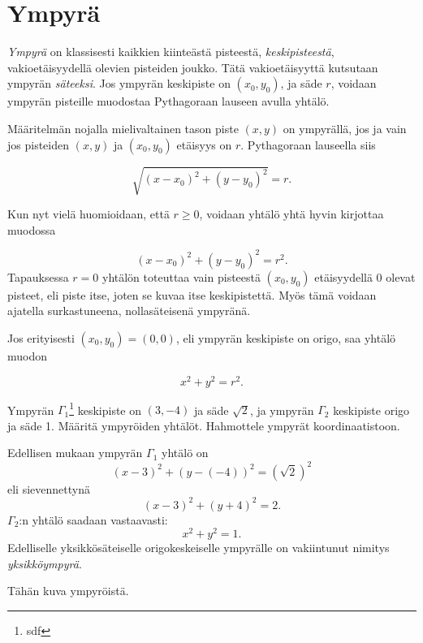 \section{Ympyrä}


\emph{Ympyrä} on klassisesti kaikkien kiinteästä pisteestä, \emph{keskipisteestä}, vakioetäisyydellä olevien pisteiden joukko. Tätä vakioetäisyyttä kutsutaan ympyrän \emph{säteeksi}. Jos ympyrän keskipiste on $(x_{0},y_{0})$, ja säde $r$, voidaan ympyrän pisteille muodostaa Pythagoraan lauseen avulla yhtälö.

Määritelmän nojalla mielivaltainen tason piste $(x,y)$ on ympyrällä, jos ja vain jos pisteiden $(x,y)$ ja $(x_{0},y_{0})$ etäisyys on $r$. Pythagoraan lauseella siis

\[
\sqrt{(x-x_{0})^{2}+(y-y_{0})^{2}} = r.
\]

Kun nyt vielä huomioidaan, että $r \geq 0$, voidaan yhtälö yhtä hyvin kirjottaa muodossa

\[
(x-x_{0})^{2}+(y-y_{0})^{2} = r^{2}.
\]
Tapauksessa $r=0$ yhtälön toteuttaa vain pisteestä $(x_{0},y_{0})$ etäisyydellä 0 olevat pisteet, eli piste itse, joten se kuvaa itse keskipistettä. Myös tämä voidaan ajatella surkastuneena, nollasäteisenä ympyränä.

Jos erityisesti $(x_{0},y_{0})= (0,0)$, eli ympyrän keskipiste on origo, saa yhtälö muodon

\[
x^{2}+y^{2} = r^{2}.
\]

\begin{esimerkki}
Ympyrän $\Gamma_{1}$\footnote{sdf} keskipiste on $(3,-4)$ ja säde $\sqrt{2}$, ja ympyrän $\Gamma_{2}$ keskipiste origo ja säde 1. Määritä ympyröiden yhtälöt. Hahmottele ympyrät koordinaatistoon.

\begin{esimratk}
Edellisen mukaan ympyrän $\Gamma_{1}$ yhtälö on
\[
(x-3)^{2}+(y-(-4))^{2} = (\sqrt{2})^{2}
\]
eli sievennettynä
\[
(x-3)^{2}+(y+4)^{2} = 2.
\]
$\Gamma_{2}$:n yhtälö saadaan vastaavasti:
\[
x^{2}+y^{2} = 1.
\]
Edelliselle yksikkösäteiselle origokeskeiselle ympyrälle on vakiintunut nimitys \emph{yksikköympyrä}.

Tähän kuva ympyröistä.

\end{esimratk}
\end{esimerkki}

